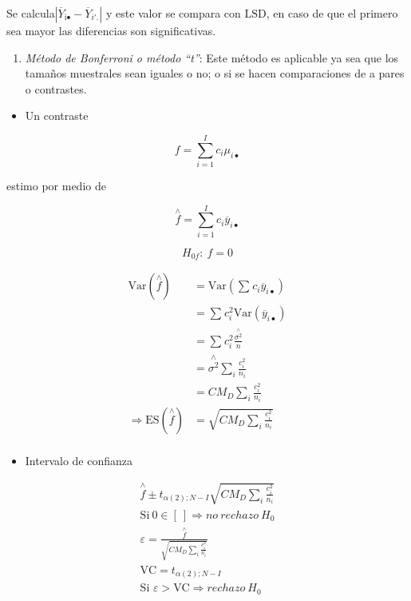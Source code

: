 \documentclass[]{book}
\providecommand{\tightlist}{%
  \setlength{\itemsep}{0pt}\setlength{\parskip}{0pt}}
\theoremstyle{definition}
\theoremstyle{definition}
\theoremstyle{definition}
\theoremstyle{remark}
\begin{document}
Se
calcula\(\left| {\overline{Y}}_{\text{i}\bullet} - {\overline{Y}}_{i'.} \right|\)
y este valor se compara con \(\text{LSD}\), en caso de que el primero
sea mayor las diferencias son significativas.

\begin{enumerate}
\def\labelenumi{\arabic{enumi})}
\setcounter{enumi}{1}
\tightlist
\item
  \emph{Método de Bonferroni o método ``t''}: Este método es aplicable
  ya sea que los tamaños muestrales sean iguales o no; o si se hacen
  comparaciones de a pares o contrastes.
\end{enumerate}

\begin{itemize}
\tightlist
\item
  Un contraste
\end{itemize}

\[
f = \sum_{i = 1}^{I}{c_{i}\mu_{i\bullet}}
\]

estimo por medio de

\[
\overset{\land}{f} = \sum_{i = 1}^{I}{c_{i}{\overline{y}}_{i\bullet}}
\]

\[
H_{0f}:\ f = 0
\]

\[
\begin{aligned}
\text{Var}\left( \overset{\land}{f} \right) &= \text{Var}\left( \sum_{}^{}{c_{i}{\overline{y}}_{i\bullet}} \right) \\
 &= \sum_{}^{}c_{i}^{2}\text{Var}\left( {\overline{y}}_{i\bullet} \right) \\
 &= \sum_{}^{}c_{i}^{2}\frac{\overset{\land}{\sigma^{2}}}{n} \\
 &= \overset{\land}{\sigma^{2}}\sum_{i}^{}\frac{c_{i}^{2}}{n_{i}} \\
 &= CM_D\sum_{i}^{}\frac{c_{i}^{2}}{n_{i}} \\
 \Rightarrow \text{ES}\left( \overset{\land}{f} \right) &= \sqrt{CM_D\sum_{i}^{}\frac{c_{i}^{2}}{n_{i}}} \\
\end{aligned}
\]

\begin{itemize}
\tightlist
\item
  Intervalo de confianza
\end{itemize}

\[
\begin{matrix}
\overset{\land}{f} \pm t_{\alpha(2);N - I}\sqrt{CM_D\sum_{i}^{}\frac{c_{i}^{2}}{n_{i}}} \\
\text{Si}\ 0 \in \left\lbrack \ \right\rbrack \Rightarrow no\ rechazo\ H_{0} \\
\varepsilon = \frac{\overset{\land}{f}}{\sqrt{CM_D\sum_{i}^{}\frac{c_{i}^{2}}{n_{i}}}} \\
\text{VC} = t_{\alpha(2);N - I} \\
\text{Si }\varepsilon > \text{VC} \Rightarrow rechazo\ H_{0} \\
\end{matrix}
\]
\end{document}
